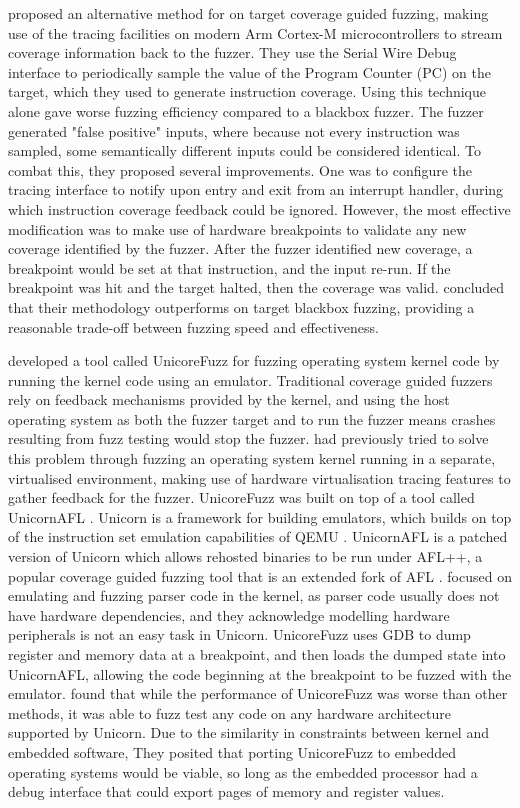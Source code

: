 \documentclass[../report.tex]{subfiles}
\begin{document}
\citet{Beckmann_2023} proposed an alternative method for on target coverage
guided fuzzing, making use of the tracing facilities on modern Arm Cortex-M
microcontrollers to stream coverage information back to the fuzzer. They use
the Serial Wire Debug interface to periodically sample the value of the Program
Counter (PC) on the target, which they used to generate instruction coverage.
Using this technique alone gave worse fuzzing efficiency compared to a blackbox
fuzzer. The fuzzer generated "false positive" inputs, where because not every
instruction was sampled, some semantically different inputs could be
considered identical. To combat this, they proposed several improvements. One
was to configure the tracing interface to notify upon entry and exit from an
interrupt handler, during which instruction coverage feedback could be ignored.
However, the most effective modification was to make use of hardware
breakpoints to validate any new coverage identified by the fuzzer. After the
fuzzer identified new coverage, a breakpoint would be set at that instruction,
and the input re-run. If the breakpoint was hit and the target halted, then the
coverage was valid. \citet{Beckmann_2023} concluded that their methodology
outperforms on target blackbox fuzzing, providing a reasonable trade-off
between fuzzing speed and effectiveness.

\citet{Maier_2019} developed a tool called UnicoreFuzz for fuzzing operating
system kernel code by running the kernel code using an emulator. Traditional
coverage guided fuzzers rely on feedback mechanisms provided by the kernel, and
using the host operating system as both the fuzzer target and to run the fuzzer
means crashes resulting from fuzz testing would stop the fuzzer.
\citet{kAFL_2017} had previously tried to solve this problem through fuzzing an
operating system kernel running in a separate, virtualised environment, making
use of hardware virtualisation tracing features to gather feedback for the
fuzzer. UnicoreFuzz was built on top of a tool called UnicornAFL
\citep{Maier_2019}. Unicorn is a framework for building emulators, which builds
on top of the instruction set emulation capabilities of QEMU \citep{Unicorn}.
UnicornAFL is a patched version of Unicorn which allows rehosted binaries to be
run under AFL++, a popular coverage guided fuzzing tool that is an extended fork of AFL
\citep{UnicornMode, AFL_2019, AFLplusplus}.
\citet{Maier_2019} focused on emulating and fuzzing parser code in the kernel,
as parser code usually does not have hardware dependencies, and they
acknowledge modelling hardware peripherals is not an easy task in Unicorn.
UnicoreFuzz uses GDB to dump register and memory data at a breakpoint, and then
loads the dumped state into UnicornAFL, allowing the code beginning at the
breakpoint to be fuzzed with the emulator. \citet{Maier_2019} found that while
the performance of UnicoreFuzz was worse than other methods, it was able to
fuzz test any code on any hardware architecture supported by Unicorn. Due to
the similarity in constraints between kernel and embedded software, They
posited that porting UnicoreFuzz to embedded operating systems would be viable,
so long as the embedded processor had a debug interface that could export pages
of memory and register values.
\end{document}
